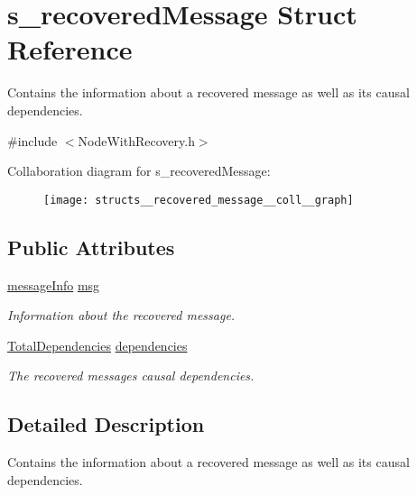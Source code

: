 \hypertarget{structs__recovered_message}{}\section{s\+\_\+recovered\+Message Struct Reference}
\label{structs__recovered_message}


Contains the information about a recovered message as well as its causal dependencies.  




{\ttfamily \#include $<$Node\+With\+Recovery.\+h$>$}



Collaboration diagram for s\+\_\+recovered\+Message\+:
\nopagebreak
\begin{figure}[H]
\begin{center}
\leavevmode
\texttt{[image: structs\_\_recovered\_message\_\_coll\_\_graph]}
\end{center}
\end{figure}
\subsection*{Public Attributes}
\begin{DoxyCompactItemize}
\item 
\hyperlink{structures_8h_a7e7bdc1d2fff8a9436f2f352b2711ed6}{message\+Info} \hyperlink{structs__recovered_message_a585360581eb2222b2a9ec5b91076054a}{msg}
\begin{DoxyCompactList}\small\item\em Information about the recovered message. \end{DoxyCompactList}\item 
\hyperlink{class_total_dependencies}{Total\+Dependencies} \hyperlink{structs__recovered_message_a95db2608749458c7b7e70bd5b612ba2d}{dependencies}
\begin{DoxyCompactList}\small\item\em The recovered message\textquotesingle{}s causal dependencies. \end{DoxyCompactList}\end{DoxyCompactItemize}


\subsection{Detailed Description}
Contains the information about a recovered message as well as its causal dependencies. 



